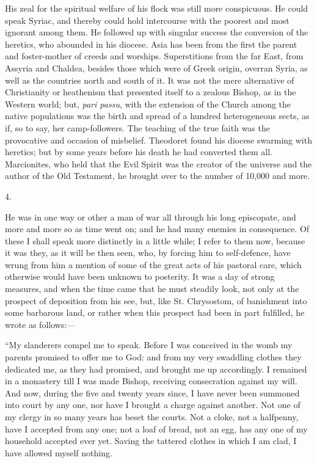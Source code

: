 His zeal for the spiritual welfare of his flock was still more
conspicuous. He could speak Syriac, and thereby could hold intercourse
with the poorest and most ignorant among them. He followed up with
singular success the conversion of the heretics, who abounded in his
diocese. Asia has been from the first the parent and foster-mother of
creeds and worships. Superstitions from the far East, from Assyria and
Chaldea, besides those which were of Greek origin, overran Syria, as
well as the countries north and south of it. It was not the mere
alternative of Christianity or heathenism that presented itself to a
zealous Bishop, as in the Western world; but, \emph{pari passu}, with
the extension of the Church among the native populations was the birth
and spread of a hundred heterogeneous sects, as if, so to say, her
camp-followers. The teaching of the true faith was the provocative and
occasion of misbelief. Theodoret found his diocese swarming with
heretics; but by some years before his death he had converted them
all. Marcionites, who held that the Evil Spirit was the creator of the
universe and the author of the Old Testament, he brought over to the
number of 10,000 and more.

4.

He was in one way or other a man of war all through his long
episcopate, and more and more so as time went on; and he had many
enemies in consequence. Of these I shall speak more distinctly in a
little while; I refer to them now, because it was they, as it will be
then seen, who, by forcing him to self-defence, have wrung from him a
mention of some of the great acts of his pastoral care, which
otherwise would have been unknown to posterity. It was a day of strong
measures, and when the time came that he must steadily look, not only
at the prospect of deposition from his see, but, like St. Chrysostom,
of banishment into some barbarous land, or rather when this prospect
had been in part fulfilled, he wrote as follows:—

``My slanderers compel me to speak. Before I was conceived in
the womb my parents promised to offer me to God: and from my very
swaddling clothes they dedicated me, as they had promised, and brought
me up accordingly. I remained in a monastery till I was made Bishop,
receiving consecration against my will. And now, during the five and
twenty years since, I have never been summoned into court by any one,
nor have I brought a charge against another. Not one of my clergy in
so many years has beset the courts. Not a cloke, not a halfpenny, have
I accepted from any one; not a loaf of bread, not an egg, has any one
of my household accepted ever yet. Saving the tattered clothes in
which I am clad, I have allowed myself nothing.

